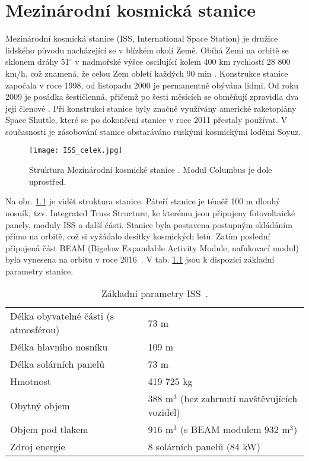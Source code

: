 %
\chapter{Mezinárodní kosmická stanice}
Mezinárodní kosmická stanice (ISS, International Space Station) je družice lidského původu nacházející se v blízkém okolí Země. Obíhá Zemi na orbitě se sklonem dráhy 51$^{\circ}$ \cite{ISS_wiki} v nadmořské výšce oscilující kolem 400 km rychlostí 28 800 km/h, což znamená, že celou Zem obletí každých 90 min \cite{ISS_where}. Konstrukce stanice započala v roce 1998, od listopadu 2000 je permanentně obývána lidmi. Od roku 2009 je posádka šestičlenná, přičemž po šesti měsících se obměňují zpravidla dva její členové \cite{ISS_wiki}. Při konstrukci stanice byly značně využívány americké raketoplány Space Shuttle, které se po dokončení stanice v roce 2011 přestaly používat. V současnosti je zásobování stanice obstaráváno ruskými kosmickými loděmi Soyuz.
\begin{figure}[H]
  \centering
  \texttt{[image: ISS\_celek.jpg]}
  \caption{Struktura Mezinárodní kosmické stanice \cite{ISS_facts}. Modul Columbus je dole uprostřed.}
  \label{fig:ISS_celek}
\end{figure}

Na obr. \ref{fig:ISS_celek} je vidět struktura stanice. Páteří stanice je téměř 100 m dlouhý nosník, tzv. Integrated Truss Structure, ke kterému jsou připojeny fotovoltaické panely, moduly ISS a další části. Stanice byla postavena postupným skládáním přímo na orbitě, což si vyžádalo desítky kosmických letů. Zatím poslední připojená část BEAM (Bigelow Expandable Activity Module, nafukovací modul) byla vynesena na orbitu v roce 2016~\cite{ISS_gifs}. V tab. \ref{tab:ISS_parametry} jsou k dispozici základní parametry stanice.
\begin{table}[h]
  \centering
  \caption{Základní parametry ISS~\cite{ISS_facts}.}
  \label{tab:ISS_parametry}
  \begin{tabular}{ll}
    \toprule
    Délka obyvatelné části (s atmosférou)&73 m\\
    Délka hlavního nosníku&109 m\\
    Délka solárních panelů&73 m\\
    Hmotnost&419 725 kg\\
    Obytný objem& 388 m$^3$ (bez zahrnutí navštěvujících vozidel)\\
    Objem pod tlakem&916 m$^3$ (s BEAM modulem 932 m$^3$)\\
    Zdroj energie& 8 solárních panelů (84 kW)\\
    \bottomrule
  \end{tabular}
\end{table}

